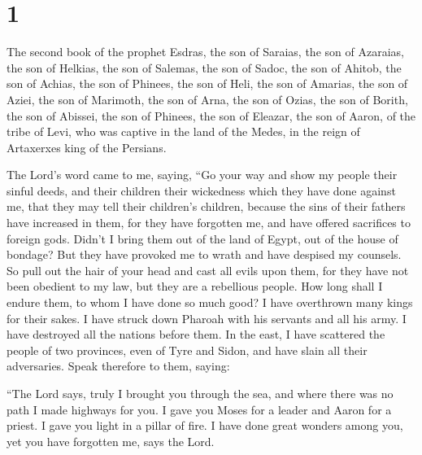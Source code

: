 \hypertarget{section}{%
\section{1}\label{section}}

 The second book of the prophet Esdras, the son of
Saraias, the son of Azaraias, the son of Helkias, the son of Salemas,
the son of Sadoc, the son of Ahitob,  the son of Achias,
the son of Phinees, the son of Heli, the son of Amarias, the son of
Aziei, the son of Marimoth, the son of Arna, the son of Ozias, the son
of Borith, the son of Abissei, the son of Phinees, the son of Eleazar,
 the son of Aaron, of the tribe of Levi, who was captive
in the land of the Medes, in the reign of Artaxerxes king of the
Persians.

 The Lord's word came to me, saying,  ``Go
your way and show my people their sinful deeds, and their children their
wickedness which they have done against me, that they may tell their
children's children,  because the sins of their fathers
have increased in them, for they have forgotten me, and have offered
sacrifices to foreign gods.  Didn't I bring them out of
the land of Egypt, out of the house of bondage? But they have provoked
me to wrath and have despised my counsels.  So pull out
the hair of your head and cast all evils upon them, for they have not
been obedient to my law, but they are a rebellious people.
 How long shall I endure them, to whom I have done so much
good?  I have overthrown many kings for their sakes. I
have struck down Pharoah with his servants and all his army.
 I have destroyed all the nations before them. In the
east, I have scattered the people of two provinces, even of Tyre and
Sidon, and have slain all their adversaries.  Speak
therefore to them, saying:

 ``The Lord says, truly I brought you through the sea,
and where there was no path I made highways for you. I gave you Moses
for a leader and Aaron for a priest.  I gave you light in
a pillar of fire. I have done great wonders among you, yet you have
forgotten me, says the Lord.

